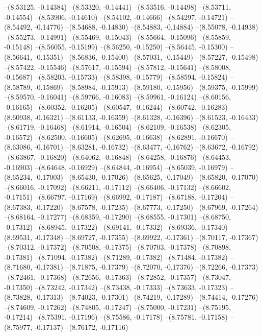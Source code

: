 --(8.53125, -0.14384)
--(8.53320, -0.14441)
--(8.53516, -0.14498)
--(8.53711, -0.14554)
--(8.53906, -0.14610)
--(8.54102, -0.14666)
--(8.54297, -0.14721)
--(8.54492, -0.14776)
--(8.54688, -0.14830)
--(8.54883, -0.14884)
--(8.55078, -0.14938)
--(8.55273, -0.14991)
--(8.55469, -0.15043)
--(8.55664, -0.15096)
--(8.55859, -0.15148)
--(8.56055, -0.15199)
--(8.56250, -0.15250)
--(8.56445, -0.15300)
--(8.56641, -0.15351)
--(8.56836, -0.15400)
--(8.57031, -0.15449)
--(8.57227, -0.15498)
--(8.57422, -0.15546)
--(8.57617, -0.15594)
--(8.57812, -0.15641)
--(8.58008, -0.15687)
--(8.58203, -0.15733)
--(8.58398, -0.15779)
--(8.58594, -0.15824)
--(8.58789, -0.15869)
--(8.58984, -0.15913)
--(8.59180, -0.15956)
--(8.59375, -0.15999)
--(8.59570, -0.16041)
--(8.59766, -0.16083)
--(8.59961, -0.16124)
--(8.60156, -0.16165)
--(8.60352, -0.16205)
--(8.60547, -0.16244)
--(8.60742, -0.16283)
--(8.60938, -0.16321)
--(8.61133, -0.16359)
--(8.61328, -0.16396)
--(8.61523, -0.16433)
--(8.61719, -0.16468)
--(8.61914, -0.16504)
--(8.62109, -0.16538)
--(8.62305, -0.16572)
--(8.62500, -0.16605)
--(8.62695, -0.16638)
--(8.62891, -0.16670)
--(8.63086, -0.16701)
--(8.63281, -0.16732)
--(8.63477, -0.16762)
--(8.63672, -0.16792)
--(8.63867, -0.16820)
--(8.64062, -0.16848)
--(8.64258, -0.16876)
--(8.64453, -0.16903)
--(8.64648, -0.16929)
--(8.64844, -0.16954)
--(8.65039, -0.16979)
--(8.65234, -0.17003)
--(8.65430, -0.17026)
--(8.65625, -0.17049)
--(8.65820, -0.17070)
--(8.66016, -0.17092)
--(8.66211, -0.17112)
--(8.66406, -0.17132)
--(8.66602, -0.17151)
--(8.66797, -0.17169)
--(8.66992, -0.17187)
--(8.67188, -0.17204)
--(8.67383, -0.17220)
--(8.67578, -0.17235)
--(8.67773, -0.17250)
--(8.67969, -0.17264)
--(8.68164, -0.17277)
--(8.68359, -0.17290)
--(8.68555, -0.17301)
--(8.68750, -0.17312)
--(8.68945, -0.17322)
--(8.69141, -0.17332)
--(8.69336, -0.17340)
--(8.69531, -0.17348)
--(8.69727, -0.17355)
--(8.69922, -0.17361)
--(8.70117, -0.17367)
--(8.70312, -0.17372)
--(8.70508, -0.17375)
--(8.70703, -0.17378)
--(8.70898, -0.17381)
--(8.71094, -0.17382)
--(8.71289, -0.17382)
--(8.71484, -0.17382)
--(8.71680, -0.17381)
--(8.71875, -0.17379)
--(8.72070, -0.17376)
--(8.72266, -0.17373)
--(8.72461, -0.17368)
--(8.72656, -0.17363)
--(8.72852, -0.17357)
--(8.73047, -0.17350)
--(8.73242, -0.17342)
--(8.73438, -0.17333)
--(8.73633, -0.17323)
--(8.73828, -0.17313)
--(8.74023, -0.17301)
--(8.74219, -0.17289)
--(8.74414, -0.17276)
--(8.74609, -0.17262)
--(8.74805, -0.17247)
--(8.75000, -0.17231)
--(8.75195, -0.17214)
--(8.75391, -0.17196)
--(8.75586, -0.17178)
--(8.75781, -0.17158)
--(8.75977, -0.17137)
--(8.76172, -0.17116)
